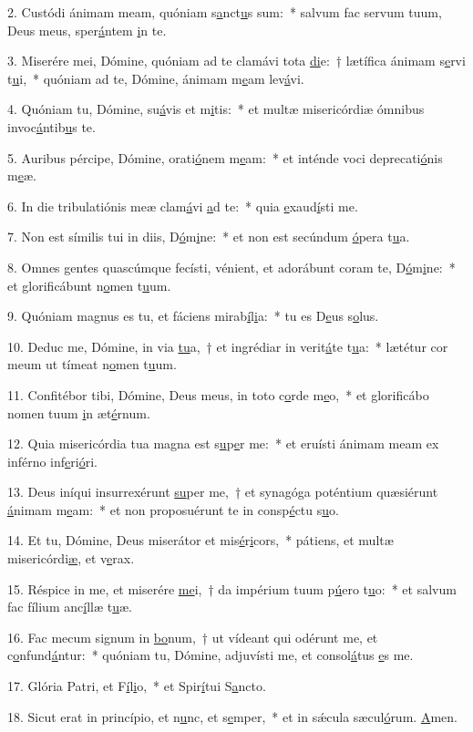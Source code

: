 2. Custódi ánimam meam, quóniam s\uline{a}nct\uline{u}s sum:~* salvum fac servum tuum, Deus meus, sper\uline{á}ntem \uline{i}n te.\par 
3. Miserére mei, Dómine, quóniam ad te clamávi tota \uline{di}e:~† lætífica ánimam s\uline{e}rvi t\uline{u}i,~* quóniam ad te, Dómine, ánimam m\uline{e}am lev\uline{á}vi.\par 
4. Quóniam tu, Dómine, su\uline{á}vis et m\uline{i}tis:~* et multæ misericórdiæ ómnibus invoc\uline{á}ntib\uline{u}s te.\par 
5. Auribus pércipe, Dómine, orati\uline{ó}nem m\uline{e}am:~* et inténde voci deprecati\uline{ó}nis m\uline{e}æ.\par 
6. In die tribulatiónis meæ clam\uline{á}vi \uline{a}d te:~* quia \uline{e}xaud\uline{í}sti me.\par 
7. Non est símilis tui in diis, D\uline{ó}m\uline{i}ne:~* et non est secúndum \uline{ó}pera t\uline{u}a.\par 
8. Omnes gentes quascúmque fecísti, vénient, et adorábunt coram te, D\uline{ó}m\uline{i}ne:~* et glorificábunt n\uline{o}men t\uline{u}um.\par 
9. Quóniam magnus es tu, et fáciens mirab\uline{í}l\uline{i}a:~* tu es D\uline{e}us s\uline{o}lus.\par 
10. Deduc me, Dómine, in via \uline{tu}a,~† et ingrédiar in verit\uline{á}te t\uline{u}a:~* lætétur cor meum ut tímeat n\uline{o}men t\uline{u}um.\par 
11. Confitébor tibi, Dómine, Deus meus, in toto c\uline{o}rde m\uline{e}o,~* et glorificábo nomen tuum \uline{i}n æt\uline{é}rnum.\par 
12. Quia misericórdia tua magna est s\uline{u}p\uline{e}r me:~* et eruísti ánimam meam ex inférno inf\uline{e}ri\uline{ó}ri.\par 
13. Deus iníqui insurrexérunt \uline{su}per me,~† et synagóga poténtium quæsiérunt \uline{á}nimam m\uline{e}am:~* et non proposuérunt te in consp\uline{é}ctu s\uline{u}o.\par 
14. Et tu, Dómine, Deus miserátor et mis\uline{é}r\uline{i}cors,~* pátiens, et multæ misericórdi\uline{æ}, et v\uline{e}rax.\par 
15. Réspice in me, et miserére \uline{me}i,~† da impérium tuum p\uline{ú}ero t\uline{u}o:~* et salvum fac fílium anc\uline{í}llæ t\uline{u}æ.\par 
16. Fac mecum signum in \uline{bo}num,~† ut vídeant qui odérunt me, et c\uline{o}nfund\uline{á}ntur:~* quóniam tu, Dómine, adjuvísti me, et consol\uline{á}tus \uline{e}s me.\par 
17. Glória Patri, et F\uline{í}l\uline{i}o,~* et Spir\uline{í}tui S\uline{a}ncto.\par 
18. Sicut erat in princípio, et n\uline{u}nc, et s\uline{e}mper,~* et in sǽcula sæcul\uline{ó}rum. \uline{A}men.\par 
